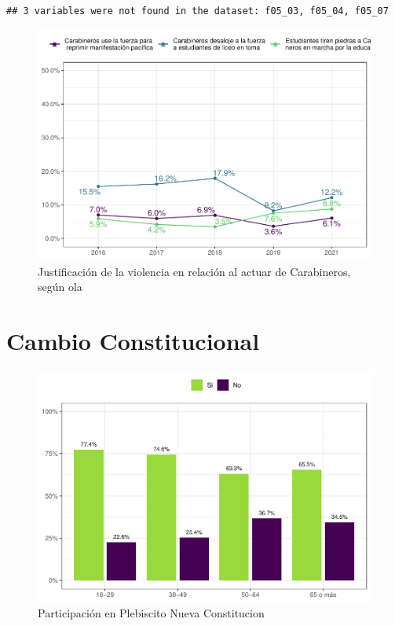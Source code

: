 \documentclass[
  12pt,
  openany]{book}
\begin{document}
\begin{verbatim}
## 3 variables were not found in the dataset: f05_03, f05_04, f05_07
\end{verbatim}

\begin{figure}

{\centering \includegraphics{reporte-elsoc_files/figure-latex/just-carab-ola-1} 

}

\caption{Justificación de la violencia en relación al actuar de Carabineros, según ola}\label{fig:just-carab-ola}
\end{figure}

\hypertarget{cambio-constitucional}{%
\chapter{Cambio Constitucional}\label{cambio-constitucional}}

\begin{figure}

{\centering \includegraphics{reporte-elsoc_files/figure-latex/particip-edad-1} 

}

\caption{Participación en Plebiscito Nueva Constitucion}\label{fig:particip-edad}
\end{figure}
\end{document}
